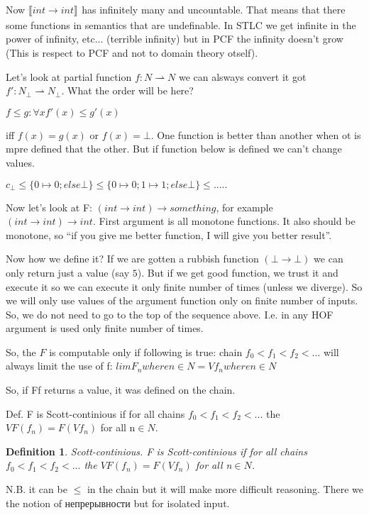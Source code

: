 \documentclass[a4paper,10pt]{book}
\newtheorem{definition}{Definition}
\newcommand{\sem}[2]{ \llbracket#1\rrbracket_{#2} }
\newcommand{\rarr}{ \rightarrow }
\begin{document}
Now 
$\sem{int \rarr int}{}$ has infinitely many and uncountable. That means that there some functions
in semantics that are undefinable. In STLC we get infinite in the power of infinity, etc... (terrible 
infinity) but in PCF the infinity doesn't grow (This is respect to PCF and not to domain theory otself).

Let's look at partial function $f: N \rightharpoonup N$ we can alsways convert it got 
$f': N_\bot \rightharpoonup N_\bot$. What the order will be here?


$ f \leq g: \forall x f'(x) \leq g'(x)$

iff $f(x) = g(x)$ or $f(x)=\bot$. One function is better than another when ot is mpre defined that
the other. But if function below is defined we can't change values.

$c_\bot \leq \{0\mapsto 0; else \bot\}
        \leq \{0\mapsto 0; 1\mapsto 1; else \bot\}
        \leq .....
        $
        
Now let's look at F: $(int \rarr int) \rarr something$, for example        
$(int \rarr int) \rarr int$. First argument is all monotone functions. It also should be monotone,
so ``if you give me better function, I will give you better result''.

Now how we define it? If we are gotten a rubbish function $(\bot \rarr\bot)$ we can only return 
just a value (say $5$). But if we get good function, we trust it and execute it so
we can execute it only finite number of times (unless we diverge). So we will only use values of the 
argument function only on finite number of inputs.  So, we do not need to go to the top of the 
sequence above. I.e. in any HOF argument is used only finite number of times.
        
So, the $F$ is computable only if following is true:
chain $f_0 < f_1 < f_2 < ...$ will always limit the use of f: 
$lim F_n where n\in N = V f_n where n\in N$


So, if Ff returns a value, it was defined on the chain.

Def. F is Scott-continious if for all chains  $f_0 < f_1 < f_2 < ...$
the $V F(f_n) = F(Vf_n)$ for all n$\in N$.
\begin{definition}{Scott-continious.}
F is Scott-continious if for all chains  $f_0 < f_1 < f_2 < ...$
the $V F(f_n) = F(Vf_n)$ for all n$\in N$.
\end{definition}
N.B. it can be $\leq$ in the chain but it will make more difficult reasoning. There we
the notion of непрерывности but for isolated input.
\end{document}

